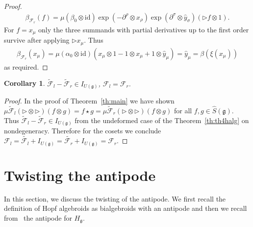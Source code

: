 \documentclass[pdftex]{sigma}
\def\gg{\mathfrak{g}}
\def\hy{\hat{y}}
\def\id{\mathrm{id}}
\newtheorem{Corollary}[Theorem]{Corollary}
\numberwithin{equation}{section}
\begin{document}
\begin{proof}
\begin{gather*}
\beta_{\mathcal{F}_r}(f)=\mu(\beta_0\otimes\id)\exp(-\partial^\rho\otimes x_\rho)\exp(\partial^\sigma\otimes\hy_\sigma)(\triangleright f\otimes 1).
\end{gather*}
For $f = x_\mu$ only the three summands with partial derivatives up to the first order survive after applying $\triangleright x_\mu$. Thus
\begin{gather*}
\beta_{\mathcal{F}_r}(x_\mu) = \mu(\alpha_0\otimes\id)(x_\mu\otimes 1 - 1\otimes x_\mu+1\otimes\hy_\mu) = \hy_\mu = \beta(\xi(x_\mu))
\end{gather*}
as required.
\end{proof}

\begin{Corollary} $\tilde{\mathcal{F}}_l - \tilde{\mathcal{F}}_r \in I_{U(\gg)}$, $\mathcal{F}_l = \mathcal{F}_r$.
\end{Corollary}
\begin{proof} In the proof of Theorem~\ref{th:main} we have shown $\mu\tilde{\mathcal{F}}_l(\triangleright\otimes\triangleright)(f\otimes g)
= f\star g = \mu\tilde{\mathcal{F}}_r(\triangleright\otimes\triangleright)(f\otimes g)$ for all $f,g\in\hat{S}(\gg)$. Thus $\tilde{\mathcal{F}}_l -\tilde{\mathcal{F}}_r\in I_{U(\gg)}$ from the undeformed case of the Theorem~\ref{th:th4halg} on nondegeneracy. Therefore for the cosets we conclude $\mathcal{F}_l = \tilde{\mathcal{F}_l}+I_{U(\gg)} = \tilde{\mathcal{F}_r} + I_{U(\gg)} =\mathcal{F}_r$.
\end{proof}

\section{Twisting the antipode}\label{sec:antipode}

In this section, we discuss the twisting of the antipode. We first recall the definition of Hopf algebroids as bialgebroids with an antipode and then we recall from~\cite{halg} the antipode for $H_\gg$.
\end{document}
